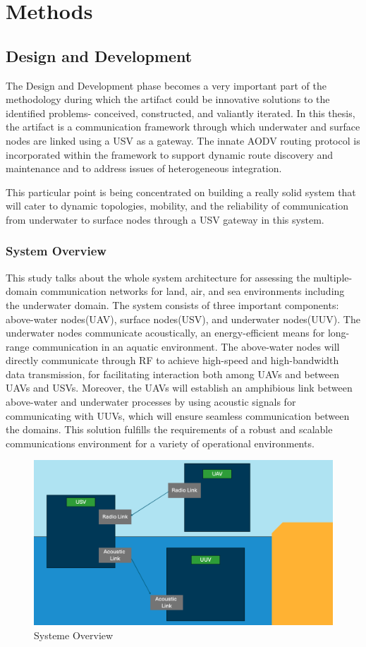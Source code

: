 \documentclass[]{nsm-thesis}
\begin{document}
\chapter{Methods}
\section{Design and Development}
The Design and Development phase becomes a very important part of the methodology during which the artifact could be innovative solutions to the identified problems- conceived, constructed, and valiantly iterated. In this thesis, the artifact is a communication framework through which underwater and surface nodes are linked using a USV as a gateway. The innate AODV routing protocol is incorporated within the framework to support dynamic route discovery and maintenance and to address issues of heterogeneous integration.

This particular point is being concentrated on building a really solid system that will cater to dynamic topologies, mobility, and the reliability of communication from underwater to surface nodes through a USV gateway in this system.
\subsection{System Overview}
This study talks about the whole system architecture for assessing the multiple-domain communication networks for land, air, and sea environments including the underwater domain. The system consists of three important components: above-water nodes(UAV), surface nodes(USV),  and underwater nodes(UUV). The underwater nodes communicate acoustically, an energy-efficient means for long-range communication in an aquatic environment. The above-water nodes will directly communicate through RF to achieve high-speed and high-bandwidth data transmission, for facilitating interaction both among UAVs and between UAVs and USVs. Moreover, the UAVs will establish an amphibious link between above-water and underwater processes by using acoustic signals for communicating with UUVs, which will ensure seamless communication between the domains. This solution fulfills the requirements of a robust and scalable communications environment for a variety of operational environments.
\begin{figure}[h]
\graphicspath{{/image/}} %
\centering
\includegraphics[scale=0.27]{image/Bildschirmfoto 2025-01-08 um 23.41.15.png} %
\caption{Systeme Overview}
\label{fig:mesh7} %
\end{figure}
\end{document}
